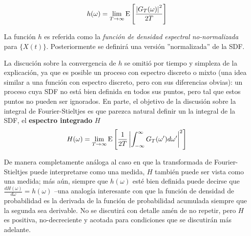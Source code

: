 \begin{equation}
h(\omega) = \lim_{T\rightarrow \infty} \mathrm{E}\left[  \frac{ \left| G_T(\omega) \right|^{2}}{2 T}  \right]
\end{equation}

La funci\'on $h$ es referida como la \textit{funci\'on de densidad espectral no-normalizada} para
$\{X(t)\}$. Posteriormente se definir\'a una versi\'on ''normalizada'' de la SDF.

La discuci\'on sobre la convergencia de $h$ se omiti\'o por tiempo y simpleza de la explicaci\'on,
ya que es posible un proceso con espectro discreto o mixto (una idea similar a una funci\'on 
con espectro discreto, pero con sus diferencias obvias):
un proceso cuya SDF no est\'a bien definida en 
todos sus puntos, pero tal que estos puntos no pueden ser ignorados.
En parte, el objetivo de la discusi\'on sobre la integral de Fourier-Stieltjes es que parezca
natural definir un la integral de la SDF, el \textbf{espectro integrado} $H$
\begin{equation*}
H(\omega) = \lim_{T\rightarrow \infty} 
\mathrm{E}\left[  \frac{1}{2 T} \left| \int_{-\infty}^{\infty} G_T(\omega^{\prime}) d\omega^{\prime} \right|^{2}  \right]
\end{equation*}

De manera completamente an\'aloga al caso en que la transformada de Fourier-Stieltjes puede
interpretarse como una medida, $H$ tambi\'en puede ser vista como una medida; m\'as a\'un,
siempre que $h(\omega)$ est\'e bien definida puede decirse que 
$\frac{dH(\omega)}{d\omega}= h(\omega)$ --una analog\'ia interesante con que la funci\'on
de densidad de probabilidad es la derivada de la funci\'on de probabilidad acumulada siempre
que la segunda sea derivable.
No se discutir\'a con detalle am\'en de no repetir, pero $H$ es positiva, no-decreciente y
acotada para condiciones que se discutir\'an m\'as adelante.

